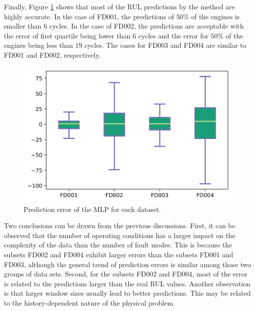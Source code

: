 \documentclass[preprint,12pt]{elsarticle}%
\begin{document}
\pagebreak

Finally, Figure \ref{Fig:rul_plots_boxplot} shows that most of the RUL predictions by the method are highly accurate. In the case of FD001, the predictions of $50\%$ of the engines is smaller than $6$ cycles. In the case of FD002, the predictions are acceptable with the error of first quartile being lower than $6$ cycles and the error for $50\%$ of the engines being less than $19$ cycles. The cases for FD003 and FD004 are similar to FD001 and FD002, respectively.

\begin{figure}[!h]
\begin{center}
\includegraphics[scale=0.70]{Figures/error_stats_boxplot.png}
\caption{Prediction error of the MLP for each dataset.}
\label{Fig:rul_plots_boxplot}
\end{center}
\end{figure}

Two conclusions can be drawn from the previous discussions. First, it can be observed that the number of operating conditions has a larger impact on the complexity of the data than the number of fault modes. This is because the subsets FD002 and FD004 exhibit larger errors than the subsets FD001 and FD003, although the general trend of prediction errors is similar among those two groups of data sets. Second, for the subsets FD002 and FD004, most of the error is related to the predictions larger than the real RUL values. Another observation is that larger window sizes usually lead to better predictions. This may be related to the history-dependent nature of the physical problem.

\end{document}
